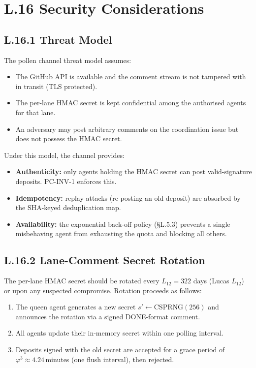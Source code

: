 \section*{L.16 \quad Security Considerations}
\label{sec:appl-security}

\subsection*{L.16.1 \quad Threat Model}

The pollen channel threat model assumes:
\begin{itemize}
\item The GitHub API is available and the comment stream is not
  tampered with in transit (TLS protected).
\item The per-lane HMAC secret is kept confidential among the
  authorised agents for that lane.
\item An adversary may post arbitrary comments on the coordination
  issue but does not possess the HMAC secret.
\end{itemize}

Under this model, the channel provides:
\begin{itemize}
\item \textbf{Authenticity:} only agents holding the HMAC secret can
  post valid-signature deposits.  PC-INV-1 enforces this.
\item \textbf{Idempotency:} replay attacks (re-posting an old deposit)
  are absorbed by the SHA-keyed deduplication map.
\item \textbf{Availability:} the exponential back-off policy
  (§L.5.3) prevents a single misbehaving agent from exhausting the
  quota and blocking all others.
\end{itemize}

\subsection*{L.16.2 \quad Lane-Comment Secret Rotation}

The per-lane HMAC secret should be rotated every $L_{12} = 322$ days
(Lucas $L_{12}$) or upon any suspected compromise.  Rotation proceeds
as follows:
\begin{enumerate}
\item The queen agent generates a new secret
  $s' \leftarrow \mathrm{CSPRNG}(256)$ and announces the rotation via
  a signed DONE-format comment.
\item All agents update their in-memory secret within one polling
  interval.
\item Deposits signed with the old secret are accepted for a grace
  period of $\varphi^{3} \approx 4.24$\,minutes (one flush interval),
  then rejected.
\end{enumerate}


